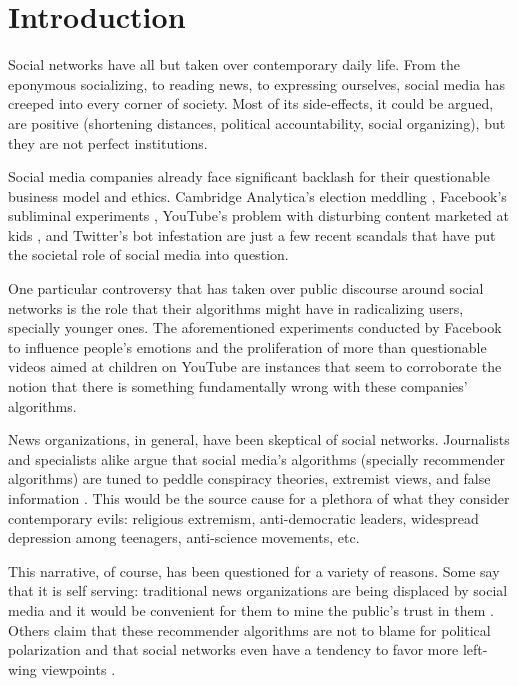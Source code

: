 
\chapter{Introduction}
\label{cap:introduction}


Social networks have all but taken over contemporary daily life. From the
eponymous socializing, to reading news, to expressing ourselves, social media
has creeped into every corner of society. Most of its side-effects, it could be
argued, are positive (shortening distances, political accountability, social
organizing), but they are not perfect institutions.

Social media companies already face significant backlash for their questionable
business model and ethics. Cambridge Analytica's election meddling \citep{},
Facebook's subliminal experiments \citep{}, YouTube's problem with disturbing
content marketed at kids \citep{}, and Twitter's bot infestation \citep{} are
just a few recent scandals that have put the societal role of social media into
question.

One particular controversy that has taken over public discourse around social
networks is the role that their algorithms might have in radicalizing users,
specially younger ones. The aforementioned experiments conducted by Facebook to
influence people's emotions and the proliferation of more than questionable
videos aimed at children on YouTube are instances that seem to corroborate the
notion that there is something fundamentally wrong with these companies'
algorithms.

News organizations, in general, have been skeptical of social networks.
Journalists and specialists alike argue that social media's algorithms
(specially recommender algorithms) are tuned to peddle conspiracy theories,
extremist views, and false information \citep{}. This would be the source cause
for a plethora of what they consider contemporary evils: religious extremism,
anti-democratic leaders, widespread depression among teenagers, anti-science
movements, etc.

This narrative, of course, has been questioned for a variety of reasons. Some
say that it is self serving: traditional news organizations are being displaced
by social media and it would be convenient for them to mine the public's trust
in them \citep{}. Others claim that these recommender algorithms are not to
blame for political polarization and that social networks even have a tendency
to favor more left-wing viewpoints \citep{}.

